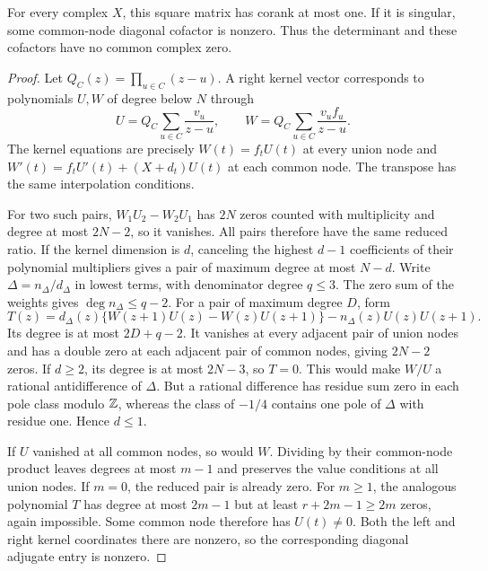 \begin{proposition}\label{prop:digamma-rank}
For every complex $X$, this square matrix has corank at most one.
If it is singular, some common-node diagonal cofactor is nonzero.
Thus the determinant and these cofactors have no common complex zero.
\end{proposition}
\begin{proof}
Let $Q_C(z)=\prod_{u\in C}(z-u)$. A right kernel vector corresponds to
polynomials $U,W$ of degree below $N$ through
\[
 U=Q_C\sum_{u\in C}\frac{v_u}{z-u},\qquad
 W=Q_C\sum_{u\in C}\frac{v_uf_u}{z-u}.
\]
The kernel equations are precisely $W(t)=f_tU(t)$ at every union
node and $W'(t)=f_tU'(t)+(X+d_t)U(t)$ at each common node.
The transpose has the same interpolation conditions.

For two such pairs, $W_1U_2-W_2U_1$ has $2N$ zeros counted with
multiplicity and degree at most $2N-2$, so it vanishes. All pairs
therefore have the same reduced ratio. If the kernel dimension is
$d$, canceling the highest $d-1$ coefficients of their polynomial
multipliers gives a pair of maximum degree at most $N-d$.
Write $\Delta=n_\Delta/d_\Delta$ in lowest terms, with denominator
degree $q\le3$. The zero sum of the weights gives
$\deg n_\Delta\le q-2$. For a pair of maximum degree $D$, form
\[
 T(z)=d_\Delta(z)\{W(z+1)U(z)-W(z)U(z+1)\}
                         -n_\Delta(z)U(z)U(z+1).
\]
Its degree is at most $2D+q-2$. It vanishes at every adjacent pair
of union nodes and has a double zero at each adjacent pair of common
nodes, giving $2N-2$ zeros. If $d\ge2$, its degree is at most
$2N-3$, so $T=0$. This would make $W/U$ a rational antidifference
of $\Delta$. But a rational difference has residue sum zero in each
pole class modulo $\mathbb Z$, whereas the class of $-1/4$ contains one
pole of $\Delta$ with residue one. Hence $d\le1$.

If $U$ vanished at all common nodes, so would $W$. Dividing by their
common-node product leaves degrees at most $m-1$ and preserves the
value conditions at all union nodes. If $m=0$, the reduced pair is
already zero. For $m\ge1$, the analogous polynomial $T$ has degree at most $2m-1$ but at least $r+2m-1\ge2m$ zeros,
again impossible. Some common node therefore has $U(t)\ne0$.
Both the left and right kernel coordinates there are nonzero,
so the corresponding diagonal adjugate entry is nonzero.
\end{proof}

